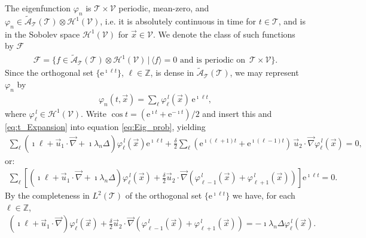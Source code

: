 \documentclass[11pt]{amsart}
\newcommand{\e}{\mathrm{e}}
\newcommand{\Tc}{\mathcal{T}}
\newcommand{\Vc}{\mathcal{V}}
\newcommand{\Hc}{\mathcal{H}}
\newcommand{\Fc}{\mathcal{F}}
\newcommand{\As}{\mathscr{A}}
\begin{document}
The eigenfunction $\varphi_n$ is $\Tc\times\Vc$ periodic, mean-zero, and
$\varphi_n\in\tilde{\As}_{\Tc}(\Tc)\otimes\Hc^1(\Vc)$,
i.e. it is absolutely continuous in time
for $t\in\Tc$, and is in the Sobolev space $\Hc^1(\Vc)$ for
$\vec{x}\in\Vc$. We denote the class of such functions by $\Fc$
%
\begin{align}\label{eq:F}
  \Fc=\{f\in\tilde{\As}_{\Tc}(\Tc)\otimes\Hc^1(\Vc)\,|\, \langle f\rangle=0  \text{ and is periodic on }
  \, \Tc\times\Vc\}. 
\end{align}
%
Since the orthogonal set $\{\e^{\imath\ell t}\}$,
${\ell\in\mathbb{Z}}$, is dense in $\tilde{\As}_{\Tc}(\Tc)$, we may represent $\varphi_n$ by 
%
\begin{align}\label{eq:t_Expansion}
  \varphi_n(t,\vec{x})=\sum_\ell\varphi_\ell^{\,l}(\vec{x})\,\e^{\imath \ell t},
\end{align}
%
where $\varphi_\ell^{\,l}\in\Hc^1(\Vc)$. Write $\cos{t}=(\e^{\imath t}+\e^{-\imath t})/2$ and insert
this and \eqref{eq:t_Expansion} into equation \eqref{eq:Eig_prob},
yielding   
%
\begin{align}
  \sum_\ell(\imath \ell + \vec{u}_1\cdot\vec{\nabla}+\imath\lambda_n\Delta)\varphi_\ell^{\,l}(\vec{x})\e^{\imath \ell t}
 +\frac{\delta}{2}\sum_\ell(\e^{\imath(\ell+1)t}+\e^{\imath(\ell-1)t})\,\vec{u}_2\cdot\vec{\nabla}\varphi_\ell^{\,l}(\vec{x})=0,
\end{align}
%
or:
%
\begin{align}
  \sum_\ell\left[(\imath \ell + \vec{u}_1\cdot\vec{\nabla}+\imath\lambda_n\Delta)\varphi_\ell^{\,l}(\vec{x})
 +\frac{\delta}{2}\vec{u}_2\cdot\vec{\nabla}(\varphi^{\,l}_{\ell-1}(\vec{x})+\varphi^{\,l}_{\ell+1}(\vec{x}))\right]\e^{\imath \ell t}=0.
\end{align}
%
By the completeness in $L^2(\Tc)$ of the orthogonal set $\{\e^{\imath \ell t}\}$ we
have, for each $\ell\in\mathbb{Z}$, 
%
\begin{align}\label{eq:Eig_prob_shift}
  (\imath \ell + \vec{u}_1\cdot\vec{\nabla})\varphi_\ell^{\,l}(\vec{x})
 +\frac{\delta}{2}\vec{u}_2\cdot\vec{\nabla}(\varphi_{\ell-1}^{\,l}(\vec{x})+\varphi_{\ell+1}^{\,l}(\vec{x}))
 =-\imath\lambda_n\Delta\varphi_\ell^{\,l}(\vec{x}).
\end{align}
%
\end{document}
